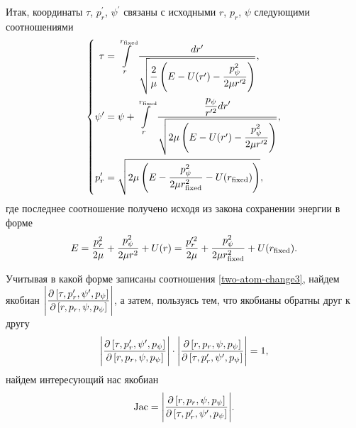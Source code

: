 Итак, координаты $\tau$, $p_r^\prime$, $\psi^\prime$ связаны с исходными $r$, $p_r$, $\psi$ следующими соотношениями
\begin{gather}
    \left\{
    \begin{aligned}
        \tau &= \int\limits_r^{r_\text{fixed}} \frac{dr^\prime}{\displaystyle \sqrt{\frac{2}{\mu} \left( E - U(r^\prime) - \frac{p_\psi^2}{2 \mu r^{\prime 2}} \right)}}, \\
        \psi^\prime &= \psi + \int\limits_r^{r_\text{fixed}} \frac{\displaystyle \frac{p_\psi}{r^{\prime 2}} dr^\prime}{\displaystyle \sqrt{2\mu \left( E - U(r^\prime) - \frac{p_\psi^2}{2 \mu r^{\prime 2}} \right)}}, \\
        p_r^\prime &= \sqrt{2 \mu \left( E - \frac{p_\psi^2}{2 \mu r_\text{fixed}^2} - U(r_\text{fixed}) \right)},
    \end{aligned}
    \right. \label{two-atom-change3}
\end{gather}
%
где последнее соотношение получено исходя из закона сохранении энергии в форме
\begin{gather}
    E = \frac{p_r^2}{2\mu} + \frac{p_\psi^2}{2 \mu r^2} + U(r) = \frac{p_r^{\prime 2}}{2 \mu} + \frac{p_\psi^2}{2 \mu r_\text{fixed}^2} + U(r_\text{fixed}). 
\end{gather}

Учитывая в какой форме записаны соотношения \eqref{two-atom-change3}, найдем якобиан $\displaystyle \Bigg\vert \frac{\partial \left[ \tau, p_r^\prime, \psi^\prime, p_\psi \right]}{\partial \left[ r, p_r, \psi, p_\psi \right]} \Bigg \vert$, а затем, пользуясь тем, что якобианы обратны друг к другу
\begin{gather}
    \Bigg\vert \frac{\partial \left[ \tau, p_r^\prime, \psi^\prime, p_\psi \right]}{\partial \left[ r, p_r, \psi, p_\psi \right]} \Bigg \vert \cdot \Bigg\vert \frac{\partial \left[ r, p_r, \psi, p_\psi \right]}{\partial \left[ \tau, p_r^\prime, \psi^\prime, p_\psi \right]} \Bigg \vert = 1,
\end{gather}
%
найдем интересующий нас якобиан
\begin{gather}
    \text{Jac} = \Bigg\vert \frac{\partial \left[ r, p_r, \psi, p_\psi \right]}{ \partial \left[ \tau, p_r^\prime, \psi^\prime, p_\psi \right]} \Bigg\vert.
\end{gather}

